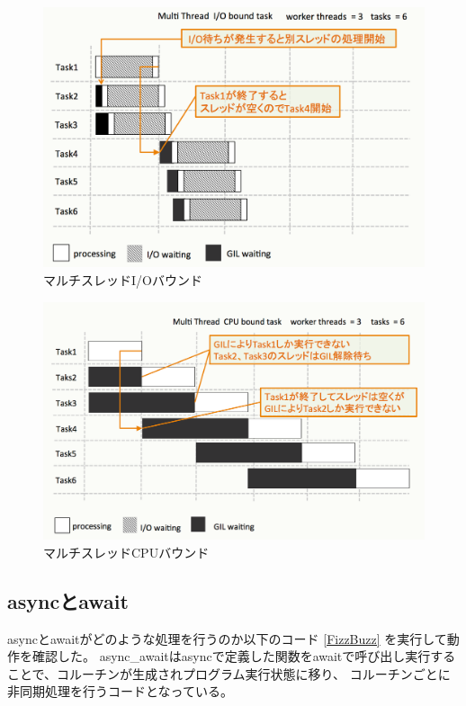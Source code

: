 \documentclass[14pt, oneside]{article}     	%
\begin{document}
\begin{figure}[H]
  \centering
  \includegraphics[width=12cm]{multithred_iobound.png}
  \caption{マルチスレッドI/Oバウンド}
  \label{multithred_iobound}
\end{figure}

\begin{figure}[H]
  \centering
  \includegraphics[width=12cm]{multithred_cpubound.png}
  \caption{マルチスレッドCPUバウンド}
  \label{multithred_cpubound}
\end{figure}

\newpage

\subsection{asyncとawait}
asyncとawaitがどのような処理を行うのか以下のコード \ref{FizzBuzz} を実行して動作を確認した。
async_awaitはasyncで定義した関数をawaitで呼び出し実行することで、コルーチンが生成されプログラム実行状態に移り、
コルーチンごとに非同期処理を行うコードとなっている。
\end{document}
